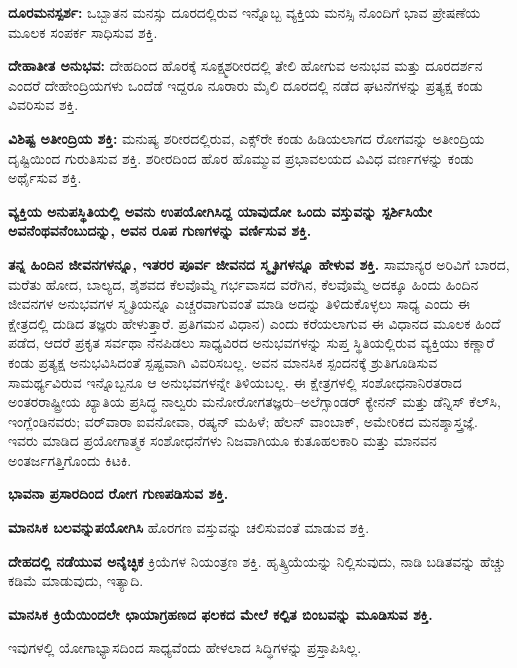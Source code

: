 \textbf{ ದೂರಮನಸ್ಪರ್ಶ:} ಒಬ್ಬಾತನ ಮನಸ್ಸು ದೂರದಲ್ಲಿರುವ ಇನ್ನೊಬ್ಬ ವ್ಯಕ್ತಿಯ ಮನಸ್ಸಿ ನೊಂದಿಗೆ ಭಾವ ಪ್ರೇಷಣೆಯ ಮೂಲಕ ಸಂಪರ್ಕ ಸಾಧಿಸುವ ಶಕ್ತಿ.

\textbf{ ದೇಹಾತೀತ ಅನುಭವ:} ದೇಹದಿಂದ ಹೊರಕ್ಕೆ ಸೂಕ್ಷ್ಮಶರೀರದಲ್ಲಿ ತೇಲಿ ಹೋಗುವ ಅನುಭವ ಮತ್ತು ದೂರದರ್ಶನ ಎಂದರೆ ದೇಹೇಂದ್ರಿಯಗಳು ಒಂದೆಡೆ ಇದ್ದರೂ ನೂರಾರು ಮೈಲಿ ದೂರದಲ್ಲಿ ನಡೆದ ಘಟನೆಗಳನ್ನು ಪ್ರತ್ಯಕ್ಷ ಕಂಡು ವಿವರಿಸುವ ಶಕ್ತಿ.

\textbf{ ವಿಶಿಷ್ಟ ಅತೀಂದ್ರಿಯ ಶಕ್ತಿ: }ಮನುಷ್ಯ ಶರೀರದಲ್ಲಿರುವ, ಎಕ್ಸ್​ರೇ ಕಂಡು ಹಿಡಿಯಲಾಗದ ರೋಗವನ್ನು ಅತೀಂದ್ರಿಯ ದೃಷ್ಟಿಯಿಂದ ಗುರುತಿಸುವ ಶಕ್ತಿ. ಶರೀರದಿಂದ ಹೊರ ಹೊಮ್ಮುವ ಪ್ರಭಾವಲಯದ ವಿವಿಧ ವರ್ಣಗಳನ್ನು ಕಂಡು ಅರ್ಥೈಸುವ ಶಕ್ತಿ.

\textbf{ ವ್ಯಕ್ತಿಯ ಅನುಪಸ್ಥಿತಿಯಲ್ಲಿ ಅವನು ಉಪಯೋಗಿಸಿದ್ದ ಯಾವುದೋ ಒಂದು ವಸ್ತುವನ್ನು ಸ್ಪರ್ಶಿಸಿಯೇ ಅವನೆಂಥವನೆಂಬುದನ್ನು, ಅವನ ರೂಪ ಗುಣಗಳನ್ನು ವರ್ಣಿಸುವ ಶಕ್ತಿ.}

\textbf{ ತನ್ನ ಹಿಂದಿನ ಜೀವನಗಳನ್ನೂ, ಇತರರ ಪೂರ್ವ ಜೀವನದ ಸ್ಮೃತಿಗಳನ್ನೂ ಹೇಳುವ ಶಕ್ತಿ.} ಸಾಮಾನ್ಯರ ಅರಿವಿಗೆ ಬಾರದ, ಮರೆತು ಹೋದ, ಬಾಲ್ಯದ, ಶೈಶವದ ಕೆಲವೊಮ್ಮೆ ಗರ್ಭವಾಸದ ವರೆಗಿನ, ಕೆಲವೊಮ್ಮೆ ಅದಕ್ಕೂ ಹಿಂದು ಹಿಂದಿನ ಜೀವನಗಳ ಅನುಭವಗಳ ಸ್ಮೃತಿಯನ್ನೂ ಎಚ್ಚರವಾಗುವಂತೆ ಮಾಡಿ ಅದನ್ನು ತಿಳಿದುಕೊಳ್ಳಲು ಸಾಧ್ಯ ಎಂದು ಈ ಕ್ಷೇತ್ರದಲ್ಲಿ ದುಡಿದ ತಜ್ಞರು ಹೇಳುತ್ತಾರೆ. ಪ್ರತಿಗಮನ ವಿಧಾನ) ಎಂದು ಕರೆಯಲಾಗುವ ಈ ವಿಧಾನದ ಮೂಲಕ ಹಿಂದೆ ಪಡೆದ, ಆದರೆ ಪ್ರಕೃತ ಸರ್ವಥಾ ನೆನಪಿಡಲು ಸಾಧ್ಯವಿರದ ಅನುಭವಗಳನ್ನು ಸುಪ್ತ ಸ್ಥಿತಿಯಲ್ಲಿರುವ ವ್ಯಕ್ತಿಯು ಕಣ್ಣಾರೆ ಕಂಡು ಪ್ರತ್ಯಕ್ಷ ಅನುಭವಿಸಿದಂತೆ ಸ್ಪಷ್ಟವಾಗಿ ವಿವರಿಸಬಲ್ಲ. ಅವನ ಮಾನಸಿಕ ಸ್ಪಂದನಕ್ಕೆ ಶ್ರುತಿಗೂಡಿಸುವ ಸಾಮರ್ಥ್ಯವಿರುವ ಇನ್ನೊಬ್ಬನೂ ಆ ಅನುಭವಗಳನ್ನೇ ತಿಳಿಯಬಲ್ಲ. ಈ ಕ್ಷೇತ್ರಗಳಲ್ಲಿ ಸಂಶೋಧನಾನಿರತರಾದ ಅಂತರರಾಷ್ಟ್ರೀಯ ಖ್ಯಾತಿಯ ಪ್ರಸಿದ್ಧ ನಾಲ್ವರು ಮನೋರೋಗತಜ್ಞರು–ಅಲೆಗ್ಸಾಂಡರ್ ಕ್ಯೇನನ್ ಮತ್ತು ಡೆನ್ನಿಸ್ ಕೆಲ್​ಸಿ, ಇಂಗ್ಲೆಂಡಿನವರು; ವರ್​ವಾರಾ ಐವನೋವಾ, ರಷ್ಯನ್ ಮಹಿಳೆ; ಹೆಲನ್ ವಾಂಬಾಕ್, ಅಮೇರಿಕದ ಮನಶ್ಶಾಸ್ತ್ರಜ್ಞೆ. ಇವರು ಮಾಡಿದ ಪ್ರಯೋಗಾತ್ಮಕ ಸಂಶೋಧನೆಗಳು ನಿಜವಾಗಿಯೂ ಕುತೂಹಲಕಾರಿ ಮತ್ತು ಮಾನವನ ಅಂತರ್ಜಗತ್ತಿಗೊಂದು ಕಿಟಕಿ.

\textbf{ ಭಾವನಾ ಪ್ರಸಾರದಿಂದ ರೋಗ ಗುಣಪಡಿಸುವ ಶಕ್ತಿ.}

\textbf{ ಮಾನಸಿಕ ಬಲವನ್ನುಪಯೋಗಿಸಿ } ಹೊರಗಣ ವಸ್ತುವನ್ನು ಚಲಿಸುವಂತೆ ಮಾಡುವ ಶಕ್ತಿ.

\textbf{ ದೇಹದಲ್ಲಿ ನಡೆಯುವ ಅನೈಚ್ಛಿಕ} ಕ್ರಿಯೆಗಳ ನಿಯಂತ್ರಣ ಶಕ್ತಿ. ಹೃತ್ಕ್ರಿಯೆಯನ್ನು ನಿಲ್ಲಿಸುವುದು, ನಾಡಿ ಬಡಿತವನ್ನು ಹೆಚ್ಚು ಕಡಿಮೆ ಮಾಡುವುದು, ಇತ್ಯಾದಿ.

\textbf{ ಮಾನಸಿಕ ಕ್ರಿಯೆಯಿಂದಲೇ ಛಾಯಾಗ್ರಹಣದ ಫಲಕದ ಮೇಲೆ ಕಲ್ಪಿತ ಬಿಂಬವನ್ನು ಮೂಡಿಸುವ ಶಕ್ತಿ.}

ಇವುಗಳಲ್ಲಿ ಯೋಗಾಭ್ಯಾಸದಿಂದ ಸಾಧ್ಯವೆಂದು ಹೇಳಲಾದ ಸಿದ್ಧಿಗಳನ್ನು ಪ್ರಸ್ತಾಪಿಸಿಲ್ಲ.

